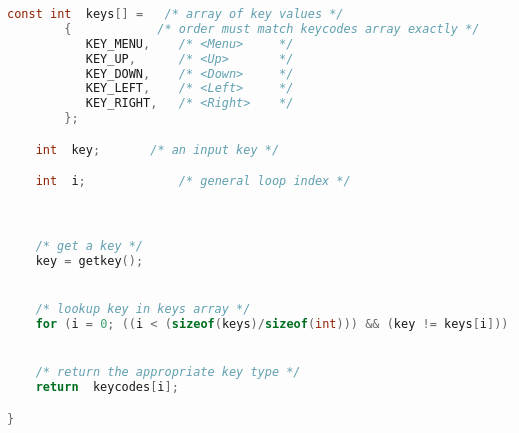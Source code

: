 \begin{lstlisting}[language=C]
    const int  keys[] =   /* array of key values */
        {			 /* order must match keycodes array exactly */
           KEY_MENU,    /* <Menu>     */
           KEY_UP,      /* <Up>       */
           KEY_DOWN,    /* <Down>     */
           KEY_LEFT,    /* <Left>     */
           KEY_RIGHT,   /* <Right>    */
        }; 

    int  key; 		/* an input key */

    int  i;           	/* general loop index */



    /* get a key */
    key = getkey();


    /* lookup key in keys array */
    for (i = 0; ((i < (sizeof(keys)/sizeof(int))) && (key != keys[i])); i++);


    /* return the appropriate key type */
    return  keycodes[i];

}
\end{lstlisting}